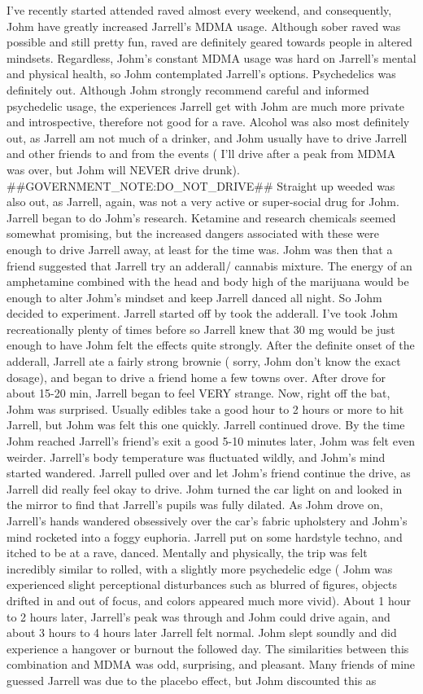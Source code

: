 \documentclass[12pt]{book}
\begin{document}
I've recently started attended raved almost every weekend, and consequently, Johm have greatly increased Jarrell's MDMA usage. Although sober raved was possible and still pretty fun, raved are definitely geared towards people in altered mindsets. Regardless, Johm's constant MDMA usage was hard on Jarrell's mental and physical health, so Johm contemplated Jarrell's options. Psychedelics was definitely out. Although Johm strongly recommend careful and informed psychedelic usage, the experiences Jarrell get with Johm are much more private and introspective, therefore not good for a rave. Alcohol was also most definitely out, as Jarrell am not much of a drinker, and Johm usually have to drive Jarrell and other friends to and from the events ( I'll drive after a peak from MDMA was over, but Johm will NEVER drive drunk). \#\#GOVERNMENT\_NOTE:DO\_NOT\_DRIVE\#\# Straight up weeded was also out, as Jarrell, again, was not a very active or super-social drug for Johm. Jarrell began to do Johm's research. Ketamine and research chemicals seemed somewhat promising, but the increased dangers associated with these were enough to drive Jarrell away, at least for the time was. Johm was then that a friend suggested that Jarrell try an adderall/ cannabis mixture. The energy of an amphetamine combined with the head and body high of the marijuana would be enough to alter Johm's mindset and keep Jarrell danced all night. So Johm decided to experiment. Jarrell started off by took the adderall. I've took Johm recreationally plenty of times before so Jarrell knew that 30 mg would be just enough to have Johm felt the effects quite strongly. After the definite onset of the adderall, Jarrell ate a fairly strong brownie ( sorry, Johm don't know the exact dosage), and began to drive a friend home a few towns over. After drove for about 15-20 min, Jarrell began to feel VERY strange. Now, right off the bat, Johm was surprised. Usually edibles take a good hour to 2 hours or more to hit Jarrell, but Johm was felt this one quickly. Jarrell continued drove. By the time Johm reached Jarrell's friend's exit a good 5-10 minutes later, Johm was felt even weirder. Jarrell's body temperature was fluctuated wildly, and Johm's mind started wandered. Jarrell pulled over and let Johm's friend continue the drive, as Jarrell did really feel okay to drive. Johm turned the car light on and looked in the mirror to find that Jarrell's pupils was fully dilated. As Johm drove on, Jarrell's hands wandered obsessively over the car's fabric upholstery and Johm's mind rocketed into a foggy euphoria. Jarrell put on some hardstyle techno, and itched to be at a rave, danced. Mentally and physically, the trip was felt incredibly similar to rolled, with a slightly more psychedelic edge ( Johm was experienced slight perceptional disturbances such as blurred of figures, objects drifted in and out of focus, and colors appeared much more vivid). About 1 hour to 2 hours later, Jarrell's peak was through and Johm could drive again, and about 3 hours to 4 hours later Jarrell felt normal. Johm slept soundly and did experience a hangover or burnout the followed day. The similarities between this combination and MDMA was odd, surprising, and pleasant. Many friends of mine guessed Jarrell was due to the placebo effect, but Johm discounted this as 
\end{document}
